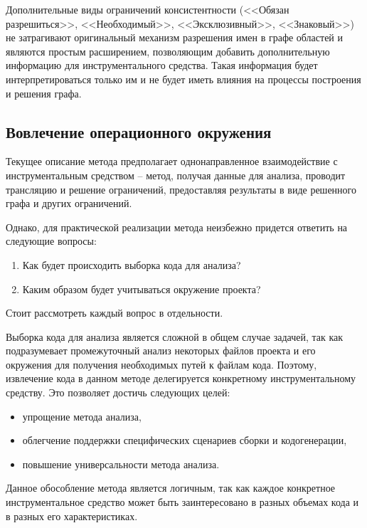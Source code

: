 Дополнительные виды ограничений консистентности (<<Обязан разрешиться>>, <<Необходимый>>, <<Эксклюзивный>>, <<Знаковый>>) не затрагивают
оригинальный механизм разрешения имен в графе областей и являются простым расширением, позволяющим добавить
дополнительную информацию для инструментального средства. Такая информация будет интерпретироваться только
им и не будет иметь влияния на процессы построения и решения графа.

\subsection{Вовлечение операционного окружения}

Текущее описание метода предполагает однонаправленное взаимодействие с инструментальным средством -- метод,
получая данные для анализа, проводит трансляцию и решение ограничений, предоставляя результаты в виде решенного
графа и других ограничений.

Однако, для практической реализации метода неизбежно придется ответить на следующие вопросы:
\begin{enumerate}[1.]
    \item Как будет происходить выборка кода для анализа?
    \item Каким образом будет учитываться окружение проекта?
\end{enumerate}
Стоит рассмотреть каждый вопрос в отдельности.

Выборка кода для анализа является сложной в общем случае задачей, так как подразумевает
промежуточный анализ некоторых файлов проекта и его окружения для получения необходимых
путей к файлам кода. Поэтому, извлечение кода в данном методе делегируется конкретному инструментальному
средству. Это позволяет достичь следующих целей:
\begin{itemize}
    \item упрощение метода анализа,
    \item облегчение поддержки специфических сценариев сборки и кодогенерации,
    \item повышение универсальности метода анализа.
\end{itemize}

Данное обособление метода является логичным, так как каждое конкретное инструментальное
средство может быть заинтересовано в разных объемах кода и в разных его характеристиках.

